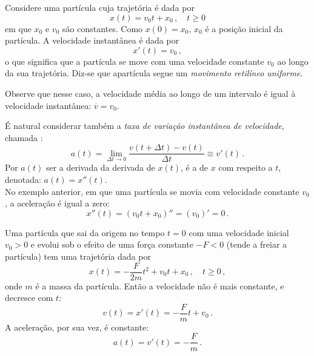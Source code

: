 \begin{ex}
Considere uma partícula cuja trajetória é dada por 
\begin{equation}\label{eq:trajhomog}
x(t)=v_0t+x_0\,,\quad t\geq 0
\end{equation}
em que $x_0$ e $v_0$ são constantes.
Como $x(0)=x_0$, $x_0$ é a posição inicial da partícula.
A velocidade instantânea é dada por 
\[
x'(t)=v_0\,,
\]
o que significa que a partícula se move com uma velocidade constante
$v_0$ ao longo da sua trajetória. Diz-se que apartícula segue um 
\emph{movimento retilíneo uniforme}.

\begin{center}
\begin{bmlimage}\end{bmlimage}
\end{center}
Observe que nesse caso, a velocidade média ao longo de um intervalo é 
igual à velocidade instantânea: $\overline{v}=v_0$. 
\end{ex}

É natural considerar também a \emph{taxa de variação instantânea de
velocidade}, chamada :
$$a(t)=\lim_{\Delta t\to 0}\frac{v(t+\Delta
t)-v(t)}{\Delta t}\equiv v'(t)\,.$$
Por $a(t)$ ser a derivada da derivada de $x(t)$, é a 
de $x$ com respeito a $t$, denotada: $a(t)=x''(t)$.\\

No exemplo anterior, em que uma partícula se movia com velocidade
constante $v_0$, a aceleração é igual a zero:
\[
x''(t)=(v_0t+x_0)''=(v_0)'=0\,.
\]

\begin{ex}
Uma partícula que sai da origem no tempo $t=0$ com uma velocidade inicial
$v_0>0$ e evolui sob o efeito de uma força constante $-F<0$ (tende a
freiar a partícula) tem uma trajetória dada por
\[x(t)=-\frac{F}{2m}t^2+v_0t+x_0\,,\quad t\geq 0\,,\] 
onde $m$ é a massa da partícula. Então a velocidade não é mais
constante, e decresce com $t$:
\[v(t)=x'(t)=-\frac{F}{m}t+v_0\,.\] 
A aceleração, por sua vez,
é constante: 
\[a(t)=v'(t)=-\frac{F}{m}\,.\] 
\end{ex}

